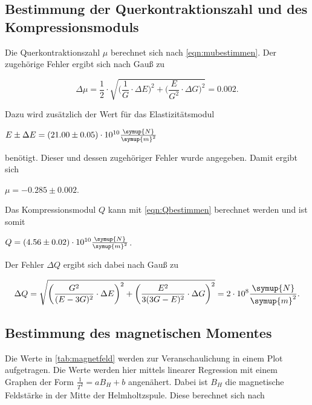 \subsection{Bestimmung der Querkontraktionszahl und des Kompressionsmoduls}

Die Querkontraktionszahl $\mu$ berechnet sich nach \eqref{eqn:mubestimmen}. Der zugehörige Fehler ergibt sich nach Gauß zu

\begin{equation}
  \Delta \mu = \frac{1}{2} \cdot \sqrt{ \bigg( \frac{1}{G} \cdot \Delta E \bigg)^2 + \bigg( \frac{E}{G^2} \cdot \Delta G \bigg)^2} = 0.002.
\end{equation}

Dazu wird zusätzlich der Wert für das Elastizitätsmodul 

\vspace{.5em}
\centerline{$E \pm \Delta E = (21.00 \pm 0.05) \cdot 10^{10} \frac{\symup{N}}{\symup{m}^2}$}
\vspace{.5em}

benötigt. Dieser und dessen zugehöriger Fehler wurde angegeben. Damit ergibt sich 

\centerline{$\mu = -0.285 \pm 0.002$.}
Das Kompressionsmodul $Q$ kann mit \eqref{eqn:Qbestimmen} berechnet werden und ist somit

\vspace{.5em}
\centerline{$Q = (4.56 \pm 0.02) \cdot 10^{10} \frac{\symup{N}}{\symup{m}^2}$.}
\vspace{.5em}

Der Fehler $\Delta Q$ ergibt sich dabei nach Gauß zu

\begin{equation}
  \Delta Q = \sqrt{ \bigg( \frac{G^2}{(E - 3G)^2} \cdot \Delta E \bigg)^2 + \bigg( \frac{E^2}{3(3G - E)^2} \cdot \Delta G \bigg)^2} = 2 \cdot 10^{8} \frac{\symup{N}}{\symup{m}^2}.
\end{equation}


\subsection{Bestimmung des magnetischen Momentes}



Die Werte in \autoref{tab:magnetfeld} werden zur Veranschaulichung in einem Plot aufgetragen. Die Werte werden hier mittels linearer Regression mit einem Graphen der Form $\frac{1}{T^2} = aB_H + b$ angenähert.
Dabei ist $B_H$ die magnetische Feldstärke in der Mitte der Helmholtzspule. Diese berechnet sich nach

